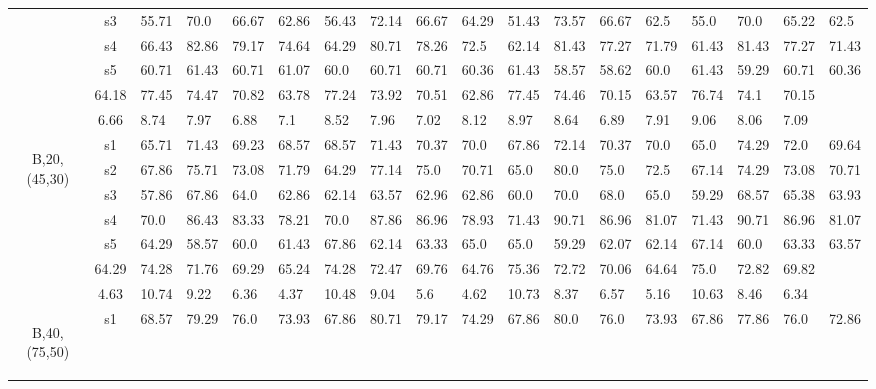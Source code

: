 \begin{table}[h]
{\begin{tabular}{cc|llll|llll|llll|llll}
 & s3 & 55.71 & 70.0 & 66.67 & 62.86 & 56.43 & 72.14 & 66.67 & 64.29 & 51.43 & 73.57 & 66.67 & 62.5 & 55.0 & 70.0 & 65.22 & 62.5 \\
 & s4 & 66.43 & 82.86 & 79.17 & 74.64 & 64.29 & 80.71 & 78.26 & 72.5 & 62.14 & 81.43 & 77.27 & 71.79 & 61.43 & 81.43 & 77.27 & 71.43 \\
 & s5 & 60.71 & 61.43 & 60.71 & 61.07 & 60.0 & 60.71 & 60.71 & 60.36 & 61.43 & 58.57 & 58.62 & 60.0 & 61.43 & 59.29 & 60.71 & 60.36 \\
\rowcolor{lightgray!50}\multicolumn{2}{r|}{avg} & 64.18 & 77.45 & 74.47 & 70.82 & 63.78 & 77.24 & 73.92 & 70.51 & 62.86 & 77.45 & 74.46 & 70.15 & 63.57 & 76.74 & 74.1 & 70.15 \\
\rowcolor{lightgray!50}\multicolumn{2}{r|}{std} & 6.66 & 8.74 & 7.97 & 6.88 & 7.1 & 8.52 & 7.96 & 7.02 & 8.12 & 8.97 & 8.64 & 6.89 & 7.91 & 9.06 & 8.06 & 7.09 \\
\multirow{6}{*}{\begin{sideways}B,20,(45,30)\end{sideways}} & s1 & 65.71 & 71.43 & 69.23 & 68.57 & 68.57 & 71.43 & 70.37 & 70.0 & 67.86 & 72.14 & 70.37 & 70.0 & 65.0 & 74.29 & 72.0 & 69.64 \\
 & s2 & 67.86 & 75.71 & 73.08 & 71.79 & 64.29 & 77.14 & 75.0 & 70.71 & 65.0 & 80.0 & 75.0 & 72.5 & 67.14 & 74.29 & 73.08 & 70.71 \\
 & s3 & 57.86 & 67.86 & 64.0 & 62.86 & 62.14 & 63.57 & 62.96 & 62.86 & 60.0 & 70.0 & 68.0 & 65.0 & 59.29 & 68.57 & 65.38 & 63.93 \\
 & s4 & 70.0 & 86.43 & 83.33 & 78.21 & 70.0 & 87.86 & 86.96 & 78.93 & 71.43 & 90.71 & 86.96 & 81.07 & 71.43 & 90.71 & 86.96 & 81.07 \\
 & s5 & 64.29 & 58.57 & 60.0 & 61.43 & 67.86 & 62.14 & 63.33 & 65.0 & 65.0 & 59.29 & 62.07 & 62.14 & 67.14 & 60.0 & 63.33 & 63.57 \\
\rowcolor{lightgray!50}\multicolumn{2}{r|}{avg} & 64.29 & 74.28 & 71.76 & 69.29 & 65.24 & 74.28 & 72.47 & 69.76 & 64.76 & 75.36 & 72.72 & 70.06 & 64.64 & 75.0 & 72.82 & 69.82 \\
\rowcolor{lightgray!50}\multicolumn{2}{r|}{std} & 4.63 & 10.74 & 9.22 & 6.36 & 4.37 & 10.48 & 9.04 & 5.6 & 4.62 & 10.73 & 8.37 & 6.57 & 5.16 & 10.63 & 8.46 & 6.34 \\
\multirow{6}{*}{\begin{sideways}B,40,(75,50)\end{sideways}} & s1 & 68.57 & 79.29 & 76.0 & 73.93 & 67.86 & 80.71 & 79.17 & 74.29 & 67.86 & 80.0 & 76.0 & 73.93 & 67.86 & 77.86 & 76.0 & 72.86 \\

\end{tabular}}
\end{table}
